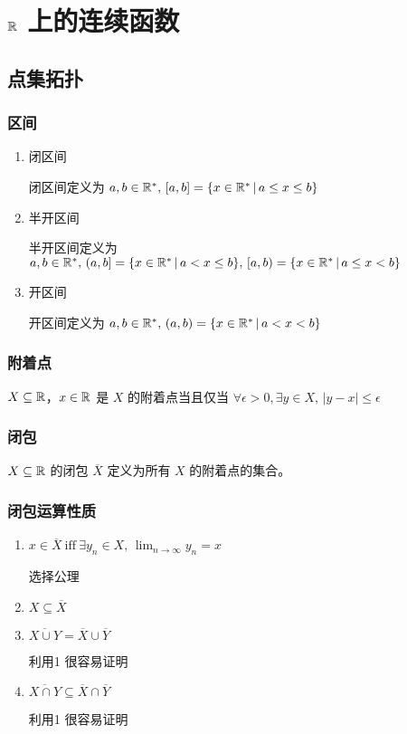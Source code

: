 \chapter{$\mathbb{R}$ 上的连续函数}

\section{点集拓扑}

\subsection{区间}

\begin{enumerate}
    \item 闭区间

    闭区间定义为 $a,b \in \mathbb{R}^*,\, [a,b] = \{x \in \mathbb{R}^* \,\vert\, a \le x \le b \}$

    \item 半开区间


    半开区间定义为 $a,b \in \mathbb{R}^*,\, (a,b] = \{x \in \mathbb{R}^* \,\vert\, a < x \le b \},\, [a,b) = \{x \in \mathbb{R}^* \,\vert\, a \le x < b \}$

    \item 开区间


    开区间定义为 $a,b \in \mathbb{R}^*,\, (a,b) = \{x \in \mathbb{R}^* \,\vert\, a < x < b \}$
\end{enumerate}

\subsection{附着点}

$X \subseteq \mathbb{R}$，$x \in \mathbb{R}$ 是 $X$ 的附着点当且仅当 $\forall \epsilon > 0, \exists y \in X,\, \lvert y -x \rvert \le \epsilon$

\subsection{闭包}

$X \subseteq \mathbb{R}$ 的闭包 $\overline{X}$ 定义为所有 $X$ 的附着点的集合。

\subsection{闭包运算性质}

\begin{enumerate}
    \item $x \in \overline{X} \: \text{iff} \: \exists y_n \in X,\, \lim_{n \to \infty} y_n = x$

    选择公理

    \item $X \subseteq \overline{X}$

    \item $\overline{X \cup Y} = \overline{X} \cup \overline{Y}$

    利用1 很容易证明

    \item $\overline{X \cap Y} \subseteq \overline{X} \cap \overline{Y}$


    利用1 很容易证明
\end{enumerate}

